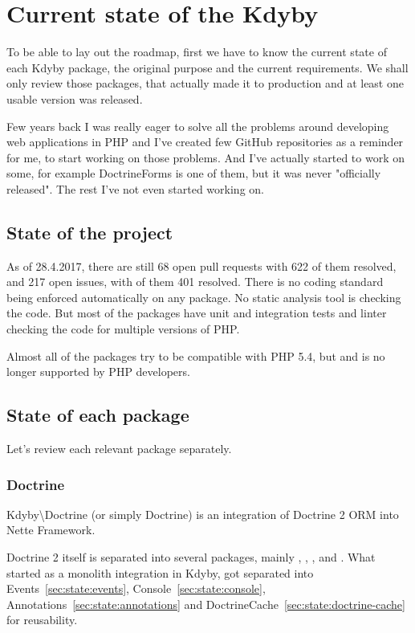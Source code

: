\chapter{Current state of the Kdyby}

To be able to lay out the roadmap, first we have to know the current state of each Kdyby package, the original purpose and the current requirements. We shall only review those packages, that actually made it to production and at least one usable version was released.

Few years back I was really eager to solve all the problems around developing web applications in PHP and I've created few GitHub repositories as a reminder for me, to start working on those problems. And I've actually started to work on some, for example DoctrineForms is one of them, but it was never "officially released". The rest I've not even started working on.

\section{State of the project}

As of 28.4.2017, there are still 68 open pull requests with 622 of them resolved, and 217 open issues, with of them 401 resolved. There is no coding standard being enforced automatically on any package. No static analysis tool is checking the code. But most of the packages have unit and integration tests and linter checking the code for multiple versions of PHP.

Almost all of the packages try to be compatible with PHP 5.4, but  and is no longer supported by PHP developers.

\section{State of each package}

Let's review each relevant package separately.

\subsection{Doctrine} \label{sec:state:doctrine}

Kdyby\textbackslash{}Doctrine (or simply Doctrine) is an integration of Doctrine 2 ORM into Nette Framework.

Doctrine 2 itself is separated into several packages, mainly , , ,  and . What started as a monolith integration in Kdyby, got separated into Events~\ref{sec:state:events}, Console~\ref{sec:state:console}, Annotations~\ref{sec:state:annotations} and DoctrineCache~\ref{sec:state:doctrine-cache} for reusability.

